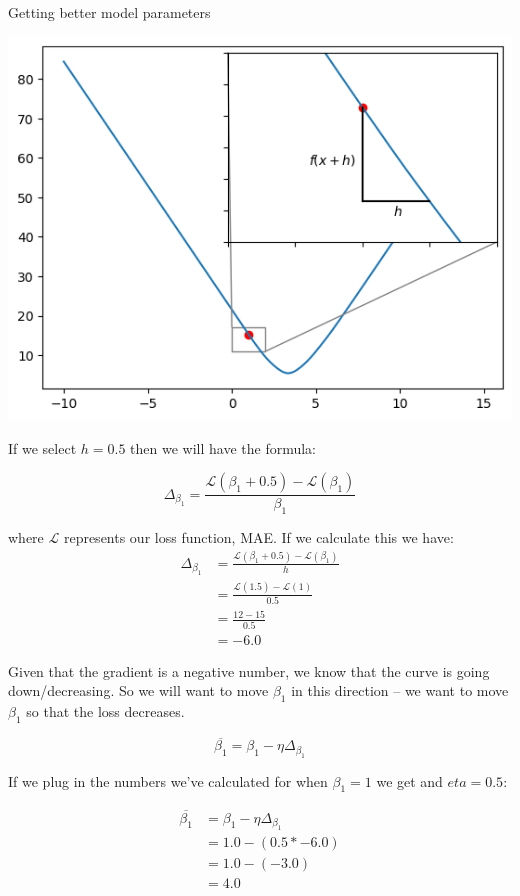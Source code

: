 \documentclass[10pt]{beamer}
\begin{document}
\begin{frame}[fragile,allowframebreaks,label=]{Getting better model parameters}
\begin{center}
\includegraphics[width=.9\linewidth]{images/small_step.png}
\end{center}

If we select \(h = 0.5\) then we will have the formula:

\[
\Delta_{\beta_1} = \frac{\mathcal{L}(\beta_1 + 0.5) - \mathcal{L}(\beta_1)}{\beta_1}
\]

where \(\mathcal{L}\) represents our loss function, MAE. If we calculate this we have:
\[\begin{aligned}
\Delta_{\beta_1} &= \frac{\mathcal{L}(\beta_1 + 0.5) - \mathcal{L}(\beta_1)}{h} \\
&= \frac{\mathcal{L}(1.5)- \mathcal{L}(1)}{0.5} \\
&= \frac{12 - 15}{0.5} \\
&= -6.0
\end{aligned}\]

Given that the gradient is a negative number, we know that the curve is going
down/decreasing. So we will want to move \(\beta_1\) in this direction -- we want to move
\(\beta_1\) so that the loss decreases.

\[
\overline{\beta_1} = \beta_1 - \eta \Delta_{\beta_1}
\]

If we plug in the numbers we've calculated for when \(\beta_1 = 1\) we get and \(eta = 0.5\):

\[\begin{aligned}
\overline{\beta_1} &= \beta_1 - \eta \Delta_{\beta_1} \\
&= 1.0 - (0.5 * -6.0) \\
&= 1.0 - (-3.0) \\
&= 4.0
\end{aligned}\]


\end{frame}
\end{document}
